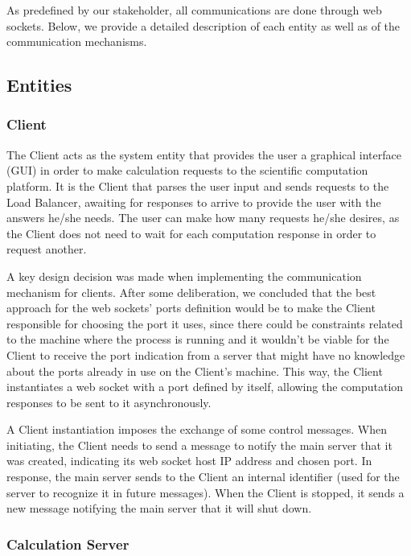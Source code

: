 \documentclass[12pt]{article}
\begin{document}
As predefined by our stakeholder, all communications are done through web sockets.
Below, we provide a detailed description of each entity as well as of the communication mechanisms.

\subsection{Entities} \label{entities} %

\subsubsection{Client}

The Client acts as the system entity that provides the user a graphical interface (GUI) in order to make calculation requests to the scientific computation
platform.
It is the Client that parses the user input and sends requests to the Load Balancer, awaiting for responses to arrive to provide the user with the answers he/she needs.
The user can make how many requests he/she desires, as the Client does not need to wait for each computation response in order to request another.

A key design decision was made when implementing the communication mechanism for clients.
After some deliberation, we concluded that the best approach for the web sockets' ports definition would be to make the Client responsible for choosing the port
it uses, since there could be constraints related to the machine where the process is running and it wouldn't be viable for the Client to receive the port
indication from a server that might have no knowledge about the ports already in use on the Client's machine.
This way, the Client instantiates a web socket with a port defined by itself, allowing the computation responses to be sent to it asynchronously.

A Client instantiation imposes the exchange of some control messages.
When initiating, the Client needs to send a message to notify the main server that it was created, indicating its web socket host IP address and chosen port.
In response, the main server sends to the Client an internal identifier (used for the server to recognize it in future messages).
When the Client is stopped, it sends a new message notifying the main server that it will shut down.

\subsubsection{Calculation Server}
\end{document}
